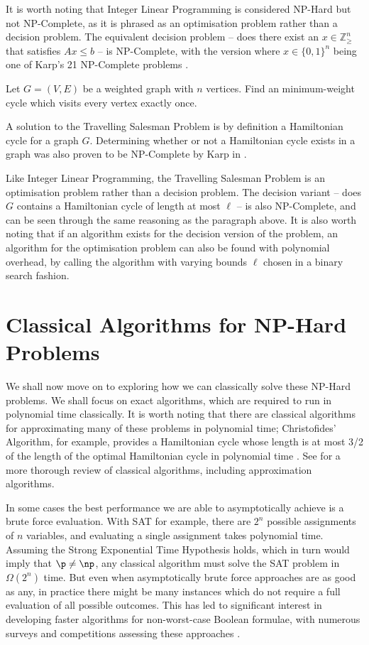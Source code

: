 It is worth noting that Integer Linear Programming is considered NP-Hard but not NP-Complete, as it is phrased as an optimisation problem rather than a decision problem. The equivalent decision problem -- does there exist an $x \in \mathbb{Z}_\geq^n$ that satisfies $Ax \leq b$ -- is NP-Complete, with the version where $x\in\{0,1\}^n$ being one of Karp's 21 NP-Complete problems \cite{karp1972}.

\begin{problem}
Let $G = (V,E)$ be a weighted graph with $n$ vertices. Find an minimum-weight cycle which visits every vertex exactly once.
\end{problem}

A solution to the Travelling Salesman Problem is by definition a Hamiltonian cycle for a graph $G$. Determining whether or not a Hamiltonian cycle exists in a graph was also proven to be NP-Complete by Karp in \cite{karp1972}.

Like Integer Linear Programming, the Travelling Salesman Problem is an optimisation problem rather than a decision problem. The decision variant -- does $G$ contains a Hamiltonian cycle of length at most $\ell$ -- is also NP-Complete, and can be seen through the same reasoning as the paragraph above. It is also worth noting that if an algorithm exists for the decision version of the problem, an algorithm for the optimisation problem can also be found with polynomial overhead, by calling the algorithm with varying bounds $\ell$ chosen in a binary search fashion.

\section{Classical Algorithms for NP-Hard Problems}

We shall now move on to exploring how we can classically solve these NP-Hard problems. We shall focus on exact algorithms, which are required to run in polynomial time classically. It is worth noting that there are classical algorithms for approximating many of these problems in polynomial time; Christofides' Algorithm, for example, provides a Hamiltonian cycle whose length is at most 3/2 of the length of the optimal Hamiltonian cycle in polynomial time \cite{christofides1976}. See \cite{garey1979} for a more thorough review of classical algorithms, including approximation algorithms.

In some cases the best performance we are able to asymptotically achieve is a brute force evaluation. With SAT for example, there are $2^n$ possible assignments of $n$ variables, and evaluating a single assignment takes polynomial time. Assuming the Strong Exponential Time Hypothesis holds, which in turn would imply that $\p \neq \np$, any classical algorithm must solve the SAT problem in $\Omega(2^n)$ time. But even when asymptotically brute force approaches are as good as any, in practice there might be many instances which do not require a full evaluation of all possible outcomes. This has led to significant interest in developing faster algorithms for non-worst-case Boolean formulae, with numerous surveys and competitions assessing these approaches \cite{sohanghpurwala2017, sat18}.

